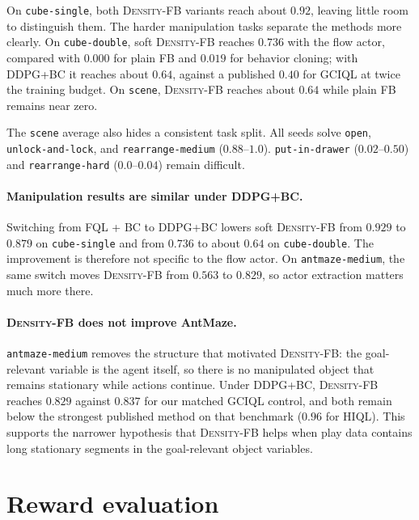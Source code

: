 \documentclass{article}
\newcommand{\DensityFB}{\textsc{Density-FB}}
\begin{document}
On \texttt{cube-single}, both \DensityFB{} variants reach about $0.92$, leaving little room to distinguish them.
The harder manipulation tasks separate the methods more clearly.
On \texttt{cube-double}, soft \DensityFB{} reaches $0.736$ with the flow actor, compared with $0.000$ for plain FB and $0.019$ for behavior cloning; with DDPG+BC it reaches about $0.64$, against a published $0.40$ for GCIQL at twice the training budget.
On \texttt{scene}, \DensityFB{} reaches about $0.64$ while plain FB remains near zero.

The \texttt{scene} average also hides a consistent task split.
All seeds solve \texttt{open}, \texttt{unlock-and-lock}, and \texttt{rearrange-medium} ($0.88$--$1.0$).
\texttt{put-in-drawer} ($0.02$--$0.50$) and \texttt{rearrange-hard} ($0.0$--$0.04$) remain difficult.

\paragraph{Manipulation results are similar under DDPG+BC.}
Switching from FQL + BC to DDPG+BC lowers soft \DensityFB{} from $0.929$ to $0.879$ on \texttt{cube-single} and from $0.736$ to about $0.64$ on \texttt{cube-double}.
The improvement is therefore not specific to the flow actor.
On \texttt{antmaze-medium}, the same switch moves \DensityFB{} from $0.563$ to $0.829$, so actor extraction matters much more there.

\paragraph{\DensityFB{} does not improve AntMaze.}
\texttt{antmaze-medium} removes the structure that motivated \DensityFB{}: the goal-relevant variable is the agent itself, so there is no manipulated object that remains stationary while actions continue.
Under DDPG+BC, \DensityFB{} reaches $0.829$ against $0.837$ for our matched GCIQL control, and both remain below the strongest published method on that benchmark ($0.96$ for HIQL).
This supports the narrower hypothesis that \DensityFB{} helps when play data contains long stationary segments in the goal-relevant object variables.

\section{Reward evaluation}
\label{sec:reward-transfer}
\end{document}
